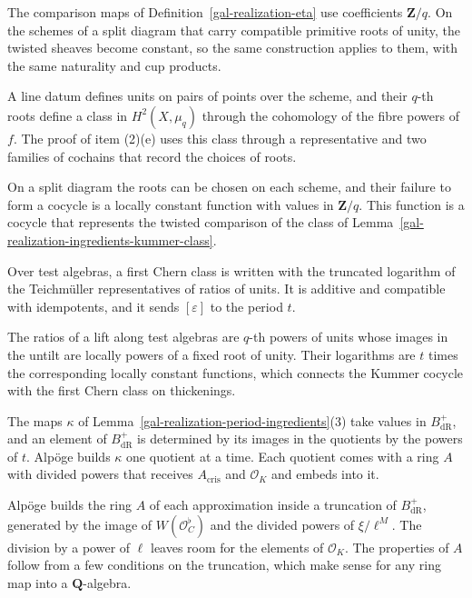 The comparison maps of Definition~\ref{gal-realization-eta} use coefficients $\mathbf Z/q$. On the schemes of a split
diagram that carry compatible primitive roots of unity, the twisted sheaves become constant, so the same construction
applies to them, with the same naturality and cup products.

A line datum defines units on pairs of points over the scheme, and their $q$-th roots define a class in
$H^2(X,\mu_q)$ through the cohomology of the fibre powers of $f$. The proof of item (2)(e) uses this class through a
representative and two families of cochains that record the choices of roots.

On a split diagram the roots can be chosen on each scheme, and their failure to form a cocycle is a locally constant
function with values in $\mathbf Z/q$. This function is a cocycle that represents the twisted comparison of the class
of Lemma~\ref{gal-realization-ingredients-kummer-class}.

Over test algebras, a first Chern class is written with the truncated logarithm of the Teichm\"uller representatives
of ratios of units. It is additive and compatible with idempotents, and it sends $[\varepsilon]$ to the period $t$.

The ratios of a lift along test algebras are $q$-th powers of units whose images in the untilt are locally powers of
a fixed root of unity. Their logarithms are $t$ times the corresponding locally constant functions, which connects the
Kummer cocycle with the first Chern class on thickenings.

The maps $\kappa$ of Lemma~\ref{gal-realization-period-ingredients}(3) take values in $B_{\mathrm{dR}}^+$, and an
element of $B_{\mathrm{dR}}^+$ is determined by its images in the quotients by the powers of $t$. Alpöge builds $\kappa$
one quotient at a time. Each quotient comes with a ring $A$ with divided powers that receives $A_{\mathrm{cris}}$ and
$\mathcal O_K$ and embeds into it.

Alpöge builds the ring $A$ of each approximation inside a truncation of $B_{\mathrm{dR}}^+$, generated by the image of
$W(\mathcal O_C^\flat)$ and the divided powers of $\xi/\ell^M$. The division by a power of $\ell$ leaves room for the
elements of $\mathcal O_K$. The properties of $A$ follow from a few conditions on the truncation, which make sense for
any ring map into a $\mathbf Q$-algebra.

